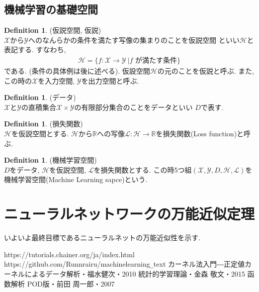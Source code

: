 \documentclass[11pt, a4paper, dvipdfmx]{jsarticle}
\theoremstyle{definition}
\newtheorem{Definition+}[Axiom+]{Definition}
\newcommand{\R}{\mathbb{R}}
\newcommand{\X}{\mathcal{X}}
\newcommand{\Y}{\mathcal{Y}}
\renewcommand{\L}{\mathcal{L}}
\newcommand{\Hil}{\mathcal{H}}
\newcommand{\MLsp}{(\X, \Y, D, \Hil, \L)}
\begin{document}
\subsection{機械学習の基礎空間}
\begin{Definition+}(仮説空間, 仮説)\\
    $\X$から$\Y$へのなんらかの条件を満たす写像の集まりのことを仮説空間
    といい$\Hil$と表記する. すなわち,
    \begin{align*}
        \Hil = \{f:\X\to\Y~| f\text{ が満たす条件}\}
    \end{align*}
    である. (条件の具体例は後に述べる). 仮設空間$\Hil$の元のことを仮説と呼ぶ.
    また, この時の$\X$を入力空間, $\Y$を出力空間と呼ぶ.
\end{Definition+}

\begin{Definition+}(データ)\\
    $\X$と$\Y$の直積集合$\X\times\Y$の有限部分集合のことをデータといい
    $D$で表す.
\end{Definition+}

\begin{Definition+}(損失関数)\\
    $\Hil$を仮説空間とする. $\Hil$から$\R$への写像$\L:\Hil\to\R$を損失関数(Loss function)と呼ぶ.
\end{Definition+}
\begin{Definition+}(機械学習空間)\\
    $D$をデータ, $\Hil$を仮説空間, $\L$を損失関数とする. この時5つ組$\MLsp$を機械学習空間(Machine Learning sapce)という.
\end{Definition+}

\section{ニューラルネットワークの万能近似定理}
いよいよ最終目標であるニューラルネットの万能近似性を示す.\\



\begin{thebibliography}{9}
     https://tutorials.chainer.org/ja/index.html
     https://github.com/Runnrairu/machinelearning\verb|_|text
     カーネル法入門―正定値カーネルによるデータ解析・福水健次・2010
     統計的学習理論・金森 敬文・2015
     函数解析 POD版・前田 周一郎・2007
\end{thebibliography}
\end{document}
